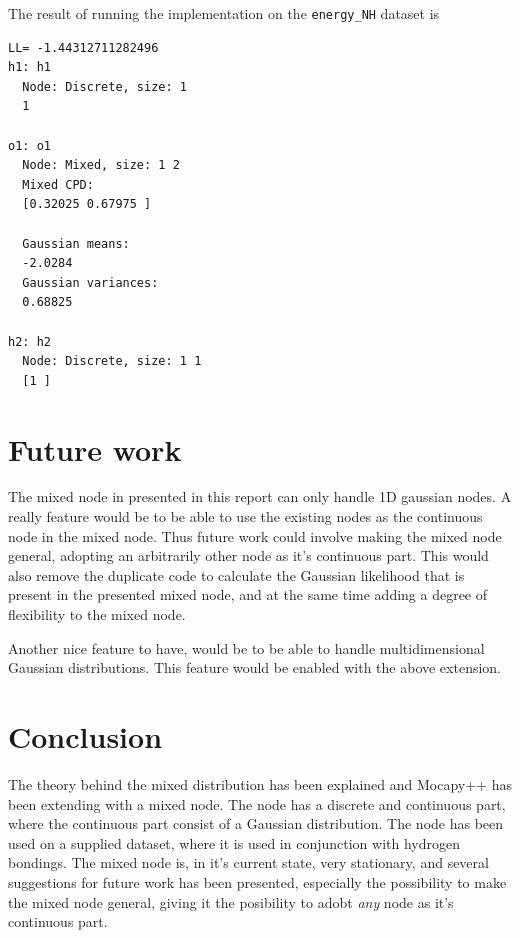 \documentclass[10pt, journal, compsoc, a4paper]{IEEEtran}
\begin{document}
The result of running the implementation on the \texttt{energy\_NH} dataset is

\begin{verbatim}
LL= -1.44312711282496
h1: h1
  Node: Discrete, size: 1 
  1 
  
o1: o1
  Node: Mixed, size: 1 2 
  Mixed CPD: 
  [0.32025 0.67975 ]

  Gaussian means: 
  -2.0284 
  Gaussian variances: 
  0.68825 
  
h2: h2
  Node: Discrete, size: 1 1 
  [1 ]  
\end{verbatim}



\section{Future work} %
\label{sec:future_work}
The mixed node in presented in this report can only handle 1D gaussian nodes. A really feature would be to be able to use the existing nodes as the continuous node in the mixed node. Thus future work could involve making the mixed node general, adopting an arbitrarily other node as it's continuous part. This would also remove the duplicate code to calculate the Gaussian likelihood that is present in the presented mixed node, and at the same time adding a degree of flexibility to the mixed node.

Another nice feature to have, would be to be able to handle multidimensional Gaussian distributions. This feature would be enabled with the above extension.


\section{Conclusion} %
\label{sec:conclusion}
The theory behind the mixed distribution has been explained and Mocapy++ has been extending with a mixed node. The node has a discrete and continuous part, where the continuous part consist of a Gaussian distribution. The node has been used on a supplied dataset, where it is used in conjunction with hydrogen bondings. The mixed node is, in it's current state, very stationary, and several suggestions for future work has been presented, especially the possibility to make the mixed node general, giving it the posibility to adobt \emph{any} node as it's continuous part.




\end{document}
